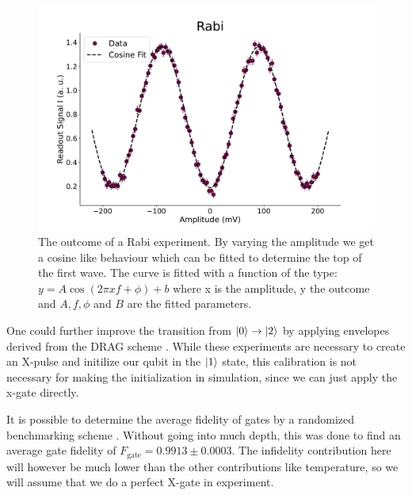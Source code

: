\begin{figure}
    \centering
    \includegraphics{Calibrations/Figures/Rabi.pdf}
    \caption{The outcome of a Rabi experiment. By varying the amplitude we get a cosine like behaviour which can be fitted to determine the top of the first wave. The curve is fitted with a function of the type: $y = A \cos(2 \pi x f + \phi) + b$ where x is the amplitude, y the outcome and $A, f, \phi$ and $B$ are the fitted parameters.}
    \label{fig:calibration_rabi}
\end{figure}

One could further improve the transition from $\ket{0}\to\ket{2}$ by applying envelopes derived from the DRAG scheme \cite{motzoi_simple_2009}. While these experiments are necessary to create an X-pulse and initilize our qubit in the $\ket{1}$ state, this calibration is not necessary for making the initialization in simulation, since we can just apply the x-gate directly. 

It is possible to determine the average fidelity of gates by a randomized benchmarking scheme \cite{knill_randomized_2008}. Without going into much depth, this was done to find an average gate fidelity of $F_{\text{gate}} = 0.9913 \pm 0.0003$. The infidelity contribution here will however be much lower than the other contributions like temperature, so we will assume that we do a perfect X-gate in experiment. 


